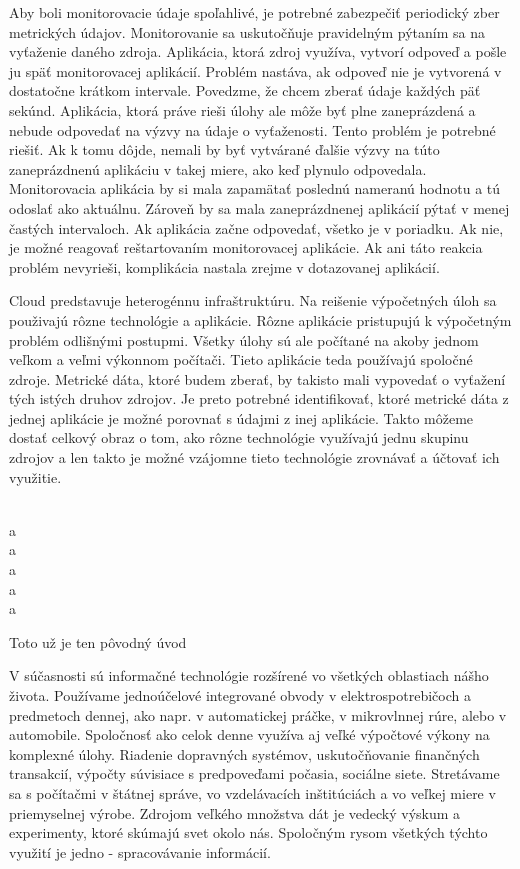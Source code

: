 \documentclass[11pt,final,oneside]{fithesis}
\begin{document}
Aby boli monitorovacie údaje spoľahlivé, je potrebné zabezpečiť periodický zber metrických údajov. Monitorovanie sa uskutočňuje pravidelným pýtaním sa na vyťaženie daného zdroja. Aplikácia, ktorá zdroj
využíva, vytvorí odpoveď a pošle ju späť monitorovacej aplikácií. Problém nastáva, ak odpoveď nie je vytvorená v dostatočne krátkom intervale. Povedzme, že chcem zberať údaje každých päť sekúnd. Aplikácia,
ktorá práve rieši úlohy ale môže byť plne zaneprázdená a nebude odpovedať na výzvy na údaje o vyťaženosti. Tento problém je potrebné riešiť. Ak k tomu dôjde, nemali by byť vytvárané ďalšie výzvy na túto
zaneprázdnenú aplikáciu v takej miere, ako keď plynulo odpovedala. Monitorovacia aplikácia by si mala zapamätať poslednú nameranú hodnotu a tú odoslať ako aktuálnu. Zároveň by sa mala zaneprázdnenej aplikácií
pýtať v menej častých intervaloch. Ak aplikácia začne odpovedať, všetko je v poriadku. Ak nie, je možné reagovať reštartovaním monitorovacej aplikácie. Ak ani táto reakcia problém nevyrieši, komplikácia 
nastala zrejme v dotazovanej aplikácií.

Cloud predstavuje heterogénnu infraštruktúru. Na reišenie výpočetných úloh sa použivajú rôzne technológie a aplikácie. Rôzne aplikácie pristupujú k výpočetným problém odlišnými postupmi. Všetky úlohy 
sú ale počítané na akoby jednom veľkom a veľmi výkonnom počítači. Tieto aplikácie teda používajú spoločné zdroje. Metrické dáta, ktoré budem zberať, by takisto mali vypovedať o vyťažení tých istých druhov 
zdrojov. Je preto potrebné identifikovať, ktoré metrické dáta z jednej aplikácie je možné porovnať s údajmi z inej aplikácie. Takto môžeme dostať celkový obraz o tom, ako rôzne technológie využívajú
jednu skupinu zdrojov a len takto je možné vzájomne tieto technológie zrovnávať a účtovať ich využitie. 





\\a
\\a
\\a
\\a
\\a

Toto už je ten pôvodný úvod

V súčasnosti sú informačné technológie rozšírené vo všetkých oblastiach nášho života. Používame jednoúčelové integrované obvody v elektrospotrebičoch a predmetoch dennej, ako napr. v automatickej práčke, v mikrovlnnej rúre,
alebo v automobile. Spoločnosť ako celok denne využíva aj veľké výpočtové výkony na komplexné úlohy. Riadenie dopravných systémov, uskutočňovanie finančných transakcií, výpočty súvisiace s predpoveďami počasia,
sociálne siete. Stretávame sa s počítačmi v štátnej správe, vo vzdelávacích inštitúciách a vo veľkej miere v priemyselnej výrobe. Zdrojom veľkého množstva dát je vedecký výskum a experimenty, ktoré skúmajú svet
okolo nás. Spoločným rysom všetkých týchto využití je jedno - spracovávanie informácií.
\end{document}

